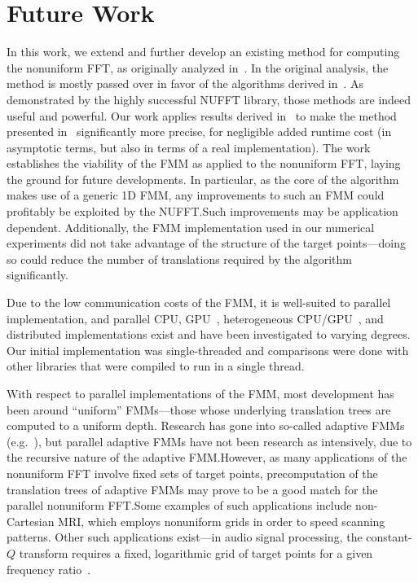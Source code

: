 \section{Future Work}

In this work, we extend and further develop an existing method for
computing the nonuniform FFT, as originally analyzed
in~\cite{Dutt95fastfourierII}. In the original analysis, the method is
mostly passed over in favor of the algorithms derived
in~\cite{dutt-rokhlin-nufft-I}. As demonstrated by the highly
successful NUFFT library, those methods are indeed useful and
powerful. Our work applies results derived in~\cite{periodic-sums} to
make the method presented in~\cite{Dutt95fastfourierII} significantly
more precise, for negligible added runtime cost (in asymptotic terms,
but also in terms of a real implementation). The work establishes the
viability of the FMM as applied to the nonuniform FFT, laying the
ground for future developments. In particular, as the core of the
algorithm makes use of a generic 1D FMM, any improvements to such an
FMM could profitably be exploited by the NUFFT.\@ Such improvements
may be application dependent. Additionally, the FMM implementation
used in our numerical experiments did not take advantage of the
structure of the target points---doing so could reduce the number of
translations required by the algorithm significantly.

Due to the low communication costs of the FMM, it is well-suited to
parallel implementation, and parallel CPU, GPU~\cite{gumerov2008fast},
heterogeneous CPU/GPU~\cite{qi-hu-thesis}, and distributed
implementations exist and have been investigated to varying
degrees. Our initial implementation was single-threaded and
comparisons were done with other libraries that were compiled to run
in a single thread.

With respect to parallel implementations of the FMM, most development
has been around ``uniform'' FMMs---those whose underlying translation
trees are computed to a uniform depth. Research has gone into
so-called adaptive FMMs (e.g.~\cite{fmm-helmholtz, adaptive-fmm}), but
parallel adaptive FMMs have not been research as intensively, due to
the recursive nature of the adaptive FMM.\@ However, as many
applications of the nonuniform FFT involve fixed sets of target
points, precomputation of the translation trees of adaptive FMMs may
prove to be a good match for the parallel nonuniform FFT.\@ Some
examples of such applications include non-Cartesian MRI, which employs
nonuniform grids in order to speed scanning patterns. Other such
applications exist---in audio signal processing, the constant-$Q$
transform requires a fixed, logarithmic grid of target points for a
given frequency ratio~\cite{constant-q}.

